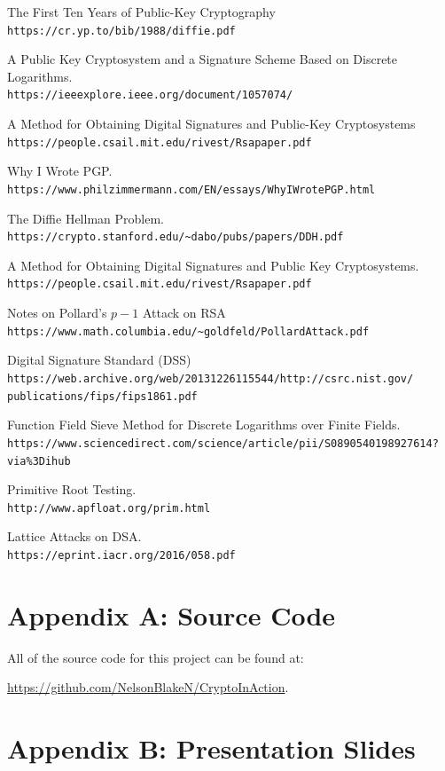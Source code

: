 \documentclass[12pt]{report}
\begin{document}
\newpage

\begin{thebibliography}{9}

    The First Ten Years of Public-Key Cryptography\\
    \texttt{https://cr.yp.to/bib/1988/diffie.pdf}
    
    A Public Key Cryptosystem and a Signature Scheme Based on Discrete Logarithms.\\
    \texttt{https://ieeexplore.ieee.org/document/1057074/}

    A Method for Obtaining Digital Signatures and Public-Key Cryptosystems\\
    \texttt{https://people.csail.mit.edu/rivest/Rsapaper.pdf}
    
    Why I Wrote PGP.\\
    \texttt{https://www.philzimmermann.com/EN/essays/WhyIWrotePGP.html}
    
    The Diffie Hellman Problem.\\
    \texttt{https://crypto.stanford.edu/\~{}dabo/pubs/papers/DDH.pdf}
    
    A Method for Obtaining Digital Signatures and Public Key Cryptosystems.\\
    \texttt{https://people.csail.mit.edu/rivest/Rsapaper.pdf}

    Notes on Pollard's $p-1$ Attack on RSA\\
    \texttt{https://www.math.columbia.edu/\~{}goldfeld/PollardAttack.pdf}

    Digital Signature Standard (DSS)\\
    \texttt{https://web.archive.org/web/20131226115544/http://csrc.nist.gov/\\publications/fips/fips1861.pdf}
    
    Function Field Sieve Method for Discrete Logarithms over Finite Fields.\\
    \texttt{https://www.sciencedirect.com/science/article/pii/S0890540198927614?via\%3Dihub}

    Primitive Root Testing.\\
    \texttt{http://www.apfloat.org/prim.html}
    
    Lattice Attacks on DSA. \\
    \texttt{https://eprint.iacr.org/2016/058.pdf}

\end{thebibliography}

\newpage
\section{Appendix A: Source Code}
All of the source code for this project can be found at:

\href{https://github.com/NelsonBlakeN/CryptoInAction}{https://github.com/NelsonBlakeN/CryptoInAction}.

\newpage
\section{Appendix B: Presentation Slides}
\end{document}
